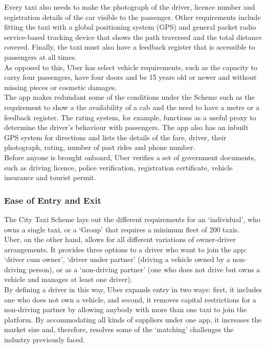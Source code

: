\documentclass[a4paper, 12pt]{article}
\begin{document}
Every taxi also needs to make the photograph of the driver, licence number and registration details of the car visible to the passenger. Other requirements include fitting the taxi with a global positioning system (GPS) and general packet radio service-based tracking device that shows the path traversed and the total distance covered. Finally, the taxi must also have a feedback register that is accessible to passengers at all times.\\

As opposed to this, Uber has select vehicle requirements, such as the capacity to carry four passengers, have four doors and be 15 years old or newer and without missing pieces or cosmetic damages.\\

The app makes redundant some of the conditions under the Scheme such as the requirement to show a the availability of a cab and the need to have a metre or a feedback register. The rating system, for example, functions as a useful proxy to determine the driver’s behaviour with passengers. The app also has an inbuilt GPS system for directions and lists the details of the fare, driver, their photograph, rating, number of past rides and phone number.\\

Before anyone is brought onboard, Uber verifies a set of government documents, such as driving licence, police verification, registration certificate, vehicle insurance and tourist permit.\\

\subsubsection{Ease of Entry and Exit}
The City Taxi Scheme lays out the different requirements for an ‘individual’, who owns a single taxi, or a ‘Group’ that requires a minimum fleet of 200 taxis. \\

Uber, on the other hand, allows for all different variations of owner-driver arrangements. It provides three options to a driver who want to join the app: ‘driver cum owner’, ‘driver under partner’ (driving a vehicle owned by a non-driving person), or as a ‘non-driving partner’ (one who does not drive but owns a vehicle and manages at least one driver).\\

By defining a driver in this way, Uber expands entry in two ways: first, it includes one who does not own a vehicle, and second, it removes capital restrictions for a non-driving partner by allowing anybody with more than one taxi to join the platform. By accommodating all kinds of suppliers under one app, it increases the market size and, therefore, resolves some of the ‘matching’ challenges the industry previously faced. \\
\end{document}
